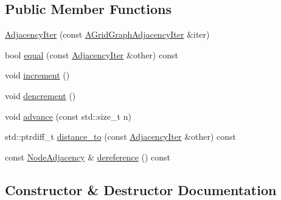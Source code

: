 \subsection*{Public Member Functions}
\begin{DoxyCompactItemize}
\item 
\hyperlink{classnifty_1_1graph_1_1detail__graph_1_1UndirectedGridGraphIter_1_1AdjacencyIter_a45cfeba6901be7c013bfbd4b2f1fe99e}{Adjacency\+Iter} (const \hyperlink{classnifty_1_1graph_1_1detail__graph_1_1UndirectedGridGraphIter_a824924927d819949af2370aa628af595}{A\+Grid\+Graph\+Adjacency\+Iter} \&iter)
\item 
bool \hyperlink{classnifty_1_1graph_1_1detail__graph_1_1UndirectedGridGraphIter_1_1AdjacencyIter_a60d075daad4bbefb8dbc6c5db1562335}{equal} (const \hyperlink{classnifty_1_1graph_1_1detail__graph_1_1UndirectedGridGraphIter_1_1AdjacencyIter}{Adjacency\+Iter} \&other) const 
\item 
void \hyperlink{classnifty_1_1graph_1_1detail__graph_1_1UndirectedGridGraphIter_1_1AdjacencyIter_ad6a4c23c77e26cd510a5e123eb39ad8e}{increment} ()
\item 
void \hyperlink{classnifty_1_1graph_1_1detail__graph_1_1UndirectedGridGraphIter_1_1AdjacencyIter_a8703126f4b9dd746d511980501bc8a51}{dencrement} ()
\item 
void \hyperlink{classnifty_1_1graph_1_1detail__graph_1_1UndirectedGridGraphIter_1_1AdjacencyIter_aea682eb4075c5a9f29e78aa27db56df1}{advance} (const std\+::size\+\_\+t n)
\item 
std\+::ptrdiff\+\_\+t \hyperlink{classnifty_1_1graph_1_1detail__graph_1_1UndirectedGridGraphIter_1_1AdjacencyIter_a0d6fe1be2a1342e475d6de63363a3336}{distance\+\_\+to} (const \hyperlink{classnifty_1_1graph_1_1detail__graph_1_1UndirectedGridGraphIter_1_1AdjacencyIter}{Adjacency\+Iter} \&other) const 
\item 
const \hyperlink{classnifty_1_1graph_1_1detail__graph_1_1UndirectedGridGraphIter_ab102d464df39aae71f7482baa37d8966}{Node\+Adjacency} \& \hyperlink{classnifty_1_1graph_1_1detail__graph_1_1UndirectedGridGraphIter_1_1AdjacencyIter_a8a284849a260d2485910d4c63d2a2a22}{dereference} () const 
\end{DoxyCompactItemize}


\subsection{Constructor \& Destructor Documentation}
\hypertarget{classnifty_1_1graph_1_1detail__graph_1_1UndirectedGridGraphIter_1_1AdjacencyIter_a45cfeba6901be7c013bfbd4b2f1fe99e}{}
